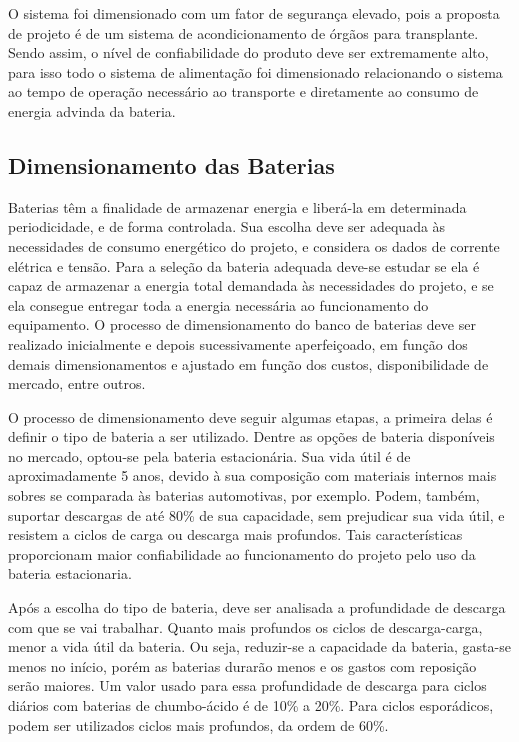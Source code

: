 O sistema foi dimensionado com um fator de segurança elevado, pois a proposta de projeto é de um sistema de acondicionamento de órgãos para transplante. Sendo assim, o nível de confiabilidade do produto deve ser extremamente alto, para isso todo o sistema de alimentação foi dimensionado relacionando o sistema ao tempo de operação necessário ao transporte e diretamente ao consumo de energia advinda da bateria.


\subsection{Dimensionamento das Baterias}
	Baterias têm a finalidade de armazenar energia e liberá-la em determinada periodicidade, e de forma controlada. Sua escolha deve ser adequada às necessidades de consumo energético do projeto, e considera os dados de corrente elétrica e tensão. Para a seleção da bateria adequada deve-se estudar se ela é capaz de armazenar a energia total demandada às necessidades do projeto, e se ela consegue entregar toda a energia necessária ao funcionamento do equipamento. O processo de dimensionamento do banco de baterias deve ser realizado inicialmente e depois sucessivamente aperfeiçoado, em função dos demais dimensionamentos e ajustado em função dos custos, disponibilidade de mercado, entre outros.

	O processo de dimensionamento deve seguir algumas etapas, a primeira delas é definir o tipo de bateria a ser utilizado. Dentre as opções de bateria disponíveis no mercado, optou-se pela bateria estacionária. Sua vida útil é de aproximadamente 5 anos, devido à sua composição com materiais internos mais sobres se comparada às baterias automotivas, por exemplo. Podem, também, suportar descargas de até 80\% de sua capacidade, sem prejudicar sua vida útil, e resistem a ciclos de carga ou descarga mais profundos. Tais características proporcionam maior confiabilidade ao funcionamento do projeto pelo uso da bateria estacionaria.
	
	Após a escolha do tipo de bateria, deve ser analisada a profundidade de descarga com que se vai trabalhar. Quanto mais profundos os ciclos de descarga-carga, menor a vida útil da bateria. Ou seja, reduzir-se a capacidade da bateria, gasta-se menos no início, porém as baterias durarão menos e os gastos com reposição serão maiores. Um valor usado para essa profundidade de descarga para ciclos diários com baterias de chumbo-ácido é de 10\% a 20\%. Para ciclos esporádicos, podem ser utilizados ciclos mais profundos, da ordem de 60\%. 
	
